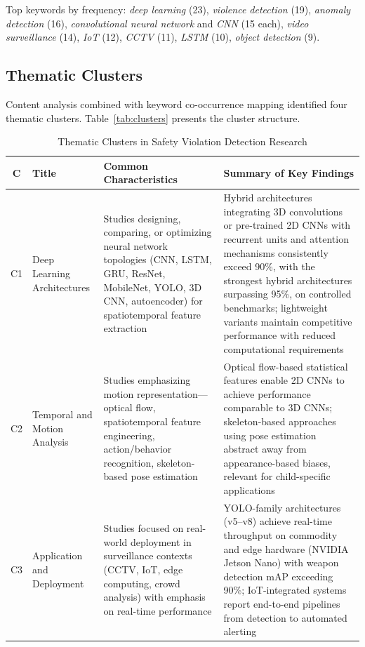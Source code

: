 \documentclass[conference]{IEEEtran}
\begin{document}
Top keywords by frequency: \textit{deep learning} (23), \textit{violence detection} (19), \textit{anomaly detection} (16), \textit{convolutional neural network} and \textit{CNN} (15 each), \textit{video surveillance} (14), \textit{IoT} (12), \textit{CCTV} (11), \textit{LSTM} (10), \textit{object detection} (9).

\subsection{Thematic Clusters}

Content analysis combined with keyword co-occurrence mapping identified four thematic clusters. Table~\ref{tab:clusters} presents the cluster structure.

\begin{table}[t]
\caption{Thematic Clusters in Safety Violation Detection Research}
\begin{center}
\scriptsize
\setlength{\tabcolsep}{3pt}
\renewcommand{\arraystretch}{1.15}
\begin{tabular}{|c|p{2.2cm}|p{5.0cm}|p{5.0cm}|}
\hline
\textbf{C} & \textbf{Title} & \textbf{Common Characteristics} & \textbf{Summary of Key Findings} \\
\hline
C1 & Deep Learning Architectures & Studies designing, comparing, or optimizing neural network topologies (CNN, LSTM, GRU, ResNet, MobileNet, YOLO, 3D CNN, autoencoder) for spatiotemporal feature extraction & Hybrid architectures integrating 3D convolutions or pre-trained 2D CNNs with recurrent units and attention mechanisms consistently exceed 90\%, with the strongest hybrid architectures surpassing 95\%, on controlled benchmarks; lightweight variants maintain competitive performance with reduced computational requirements \\
\hline
C2 & Temporal and Motion Analysis & Studies emphasizing motion representation---optical flow, spatiotemporal feature engineering, action/behavior recognition, skeleton-based pose estimation & Optical flow-based statistical features enable 2D CNNs to achieve performance comparable to 3D CNNs; skeleton-based approaches using pose estimation abstract away from appearance-based biases, relevant for child-specific applications \\
\hline
C3 & Application and Deployment & Studies focused on real-world deployment in surveillance contexts (CCTV, IoT, edge computing, crowd analysis) with emphasis on real-time performance & YOLO-family architectures (v5--v8) achieve real-time throughput on commodity and edge hardware (NVIDIA Jetson Nano) with weapon detection mAP exceeding 90\%; IoT-integrated systems report end-to-end pipelines from detection to automated alerting \\

\end{tabular}
\end{center}
\end{table}
\end{document}
